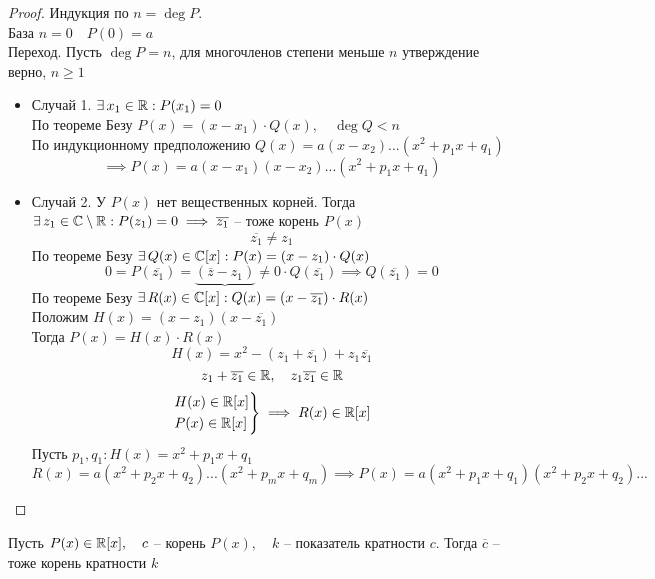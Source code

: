 \begin{proof}
	Индукция по $n = \deg P $. \\
    База $n = 0 \quad P(0) = a $ \\
    Переход. Пусть $\deg P = n$, для многочленов степени меньше $n$ утверждение верно, $n \ge 1$
    \begin{itemize}
        \item Случай 1. $\exists\, x_1 \in \mathbb{R} : P(x_1) = 0 $ \\
        По теореме Безу $P(x) = (x-x_1) \cdot Q(x), \quad \deg Q < n $ \\
        По индукционному предположению $Q(x) = a(x-x_2)...(x^2 + p_1x + q_1) $
        $$ \implies P(x) = a(x-x_1)(x-x_2)...(x^2 + p_1x + q_1) $$
        \item Случай 2. У $P(x)$ нет вещественных корней. Тогда $ \exists\, z_1 \in \mathbb{C} \setminus \mathbb{R} : P(z_1) = 0 \implies \overline{z_1} $ -- тоже корень $P(x) $
        $$ \overline{z_1} \ne z_1 $$
        По теореме Безу $ \exists\, Q(x) \in \mathbb{C}[x] : P(x) = (x - z_1) \cdot Q(x) $
        $$ 0 = P(\overline{z_1}) = \underbrace{(\overline{z} - z_1)}{\ne 0} \cdot Q(\overline{z_1}) \implies Q(\overline{z_1}) = 0 $$
        По теореме Безу $ \exists\, R(x) \in \mathbb{C} [x] : Q(x) = (x - \overline{z_1}) \cdot R(x) $ \\
        Положим $H(x) = (x - z_1)(x - \overline{z_1}) $ \\
        Тогда $P(x) = H(x) \cdot R(x) $
        $$ H(x) = x^2 - (z_1 + \overline{z_1}) + z_1 \overline{z_1} $$
        $$ z_1 + \overline{z_1} \in \mathbb{R}, \quad z_1 \overline{z_1} \in \mathbb{R} $$
        $$ \begin{rcases} H(x) \in \mathbb{R}[x] \\ P(x) \in \mathbb{R}[x] \end{rcases} \implies R(x) \in \mathbb{R}[x] $$
        Пусть $p_1, q_1 : H(x) = x^2 + p_1x + q_1 $
        $$ R(x) = a(x^2 + p_2x + q_2)...(x^2 + p_mx + q_m) \implies P(x) = a(x^2 + p_1x + q_1)(x^2 + p_2x + q_2)... $$
    \end{itemize}
\end{proof}

\begin{implication}
    Пусть $P(x) \in \mathbb{R}[x], \quad c $ -- корень $P(x), \quad k $ -- показатель кратности $c$. Тогда $ \overline{c} $ -- тоже корень кратности $k$
\end{implication}

